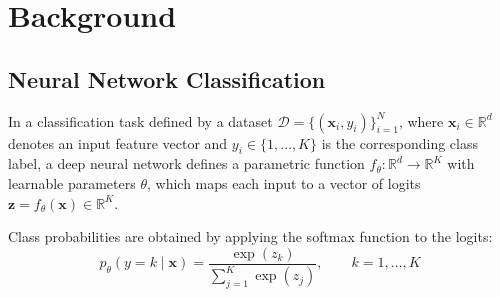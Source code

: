 

\chapter{Background}
\label{chap:background}

\section{Neural Network Classification}
\label{sec:nn_classification}
 
In a classification task defined by a dataset $\mathcal{D} = \{(\mathbf{x}_i, y_i)\}_{i=1}^{N}$, where $\mathbf{x}_i \in \mathbb{R}^d$ denotes an input feature vector and $y_i \in \{1, \ldots, K\}$ is the corresponding class label, a deep neural network defines a parametric function $f_\theta : \mathbb{R}^d \rightarrow \mathbb{R}^K$ with learnable parameters $\theta$, which maps each input to a vector of logits $\mathbf{z} = f_\theta(\mathbf{x}) \in \mathbb{R}^K$.

Class probabilities are obtained by applying the softmax function to the logits:
\begin{equation}
    p_\theta(y = k \mid \mathbf{x})
    = \frac{\exp(z_k)}{\sum_{j=1}^{K} \exp(z_j)},
    \qquad k = 1, \ldots, K
    \label{eq:softmax}
\end{equation}
